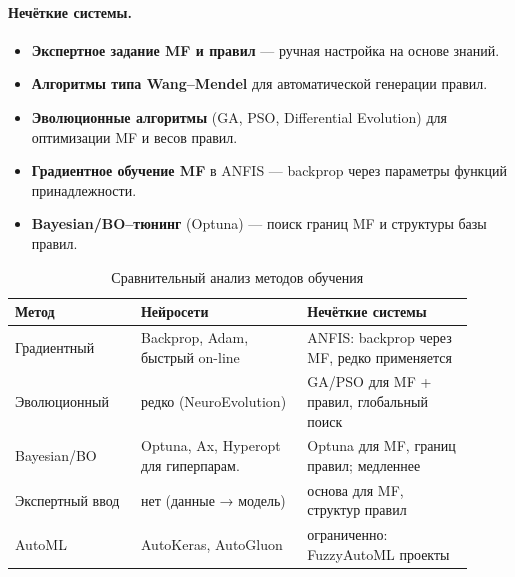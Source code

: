 \paragraph{Нечёткие системы.}
\begin{itemize}
  \item \textbf{Экспертное задание MF и правил} — ручная настройка на основе знаний.
  \item \textbf{Алгоритмы типа Wang–Mendel} \cite{Wang1992} для автоматической генерации правил.
  \item \textbf{Эволюционные алгоритмы} (GA, PSO, Differential Evolution) для оптимизации MF и весов правил.
  \item \textbf{Градиентное обучение MF} в ANFIS — backprop через параметры функций принадлежности.
  \item \textbf{Bayesian/BO–тюнинг} (Optuna) — поиск границ MF и структуры базы правил.
\end{itemize}

\begin{table}[H]
\centering\small
\caption{Сравнительный анализ методов обучения}
\begin{tabular}{@{}p{0.25\linewidth}p{0.33\linewidth}p{0.33\linewidth}@{}}
\toprule
\textbf{Метод} & \textbf{Нейросети} & \textbf{Нечёткие системы} \\ \midrule
Градиентный & 
Backprop, Adam, быстрый on-line & 
ANFIS: backprop через MF, редко применяется  \\[2pt]
Эволюционный & 
редко (NeuroEvolution) &
GA/PSO для MF + правил, глобальный поиск \\[2pt]
Bayesian/BO & 
Optuna, Ax, Hyperopt для гиперпарам. &
Optuna для MF, границ правил; медленнее \\[2pt]
Экспертный ввод & 
нет (данные → модель) &
основа для MF, структур правил \\[2pt]
AutoML & 
AutoKeras, AutoGluon &
ограниченно: FuzzyAutoML проекты \\ 
\bottomrule
\end{tabular}
\end{table}

